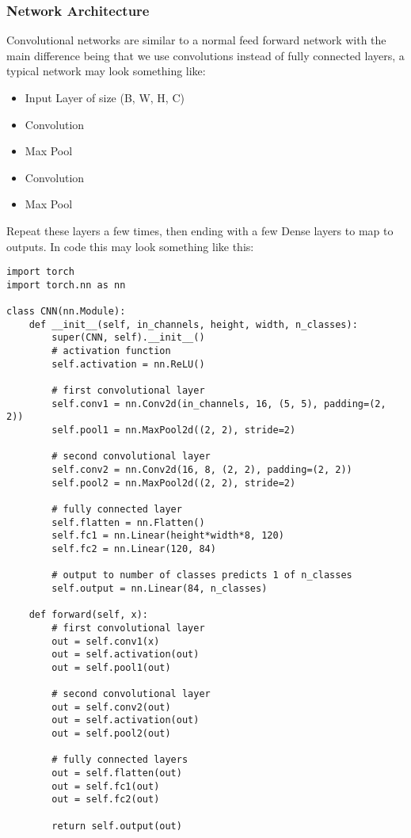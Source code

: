 \documentclass[11pt]{article}
\begin{document}
\subsubsection{Network Architecture}
\label{sec:org83a7fb6}
Convolutional networks are similar to a normal feed forward network with the main difference being that we use convolutions instead of fully connected layers, a typical network may look something like:
\begin{itemize}
\item Input Layer of size (B, W, H, C)
\item Convolution
\item Max Pool
\item Convolution
\item Max Pool
\end{itemize}
Repeat these layers a few times, then ending with a few Dense layers to map to outputs. In code this may look something like this:
\begin{verbatim}
import torch
import torch.nn as nn

class CNN(nn.Module):
    def __init__(self, in_channels, height, width, n_classes):
        super(CNN, self).__init__()
        # activation function
        self.activation = nn.ReLU()

        # first convolutional layer
        self.conv1 = nn.Conv2d(in_channels, 16, (5, 5), padding=(2, 2))
        self.pool1 = nn.MaxPool2d((2, 2), stride=2)

        # second convolutional layer
        self.conv2 = nn.Conv2d(16, 8, (2, 2), padding=(2, 2))
        self.pool2 = nn.MaxPool2d((2, 2), stride=2)

        # fully connected layer
        self.flatten = nn.Flatten()
        self.fc1 = nn.Linear(height*width*8, 120)
        self.fc2 = nn.Linear(120, 84)

        # output to number of classes predicts 1 of n_classes
        self.output = nn.Linear(84, n_classes)

    def forward(self, x):
        # first convolutional layer
        out = self.conv1(x)
        out = self.activation(out)
        out = self.pool1(out)

        # second convolutional layer
        out = self.conv2(out)
        out = self.activation(out)
        out = self.pool2(out)

        # fully connected layers
        out = self.flatten(out)
        out = self.fc1(out)
        out = self.fc2(out)

        return self.output(out)

\end{verbatim}
\end{document}
